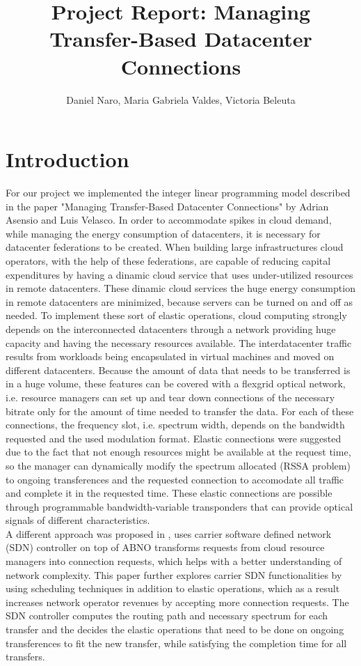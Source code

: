 \documentclass[11pt,a4paper]{article}
\title{Project Report: Managing Transfer-Based Datacenter Connections}
\author{Daniel Naro, Maria Gabriela Valdes, Victoria Beleuta}
\begin{document}
\maketitle
\section{Introduction}

For our project we implemented the integer linear programming model described in the paper "Managing Transfer-Based Datacenter Connections" by Adrian Asensio and Luis Velasco. In order to accommodate spikes in cloud demand, while managing the energy consumption of datacenters, it is necessary for datacenter federations to be created. When building large infrastructures cloud operators, with the help of these federations, are capable of reducing capital expenditures by having a dinamic cloud service that uses under-utilized resources in remote datacenters. These dinamic cloud services the huge energy consumption in remote datacenters are minimized, because servers can be turned on and off as needed. To implement these sort of elastic operations, cloud computing strongly depends on the interconnected datacenters through a network providing huge capacity and having the necessary resources available. The interdatacenter traffic results from workloads being encapsulated in virtual machines and moved on different datacenters. Because the amount of data that needs to be transferred is in a huge volume, these features can be covered with a flexgrid optical network, i.e. resource managers can set up and tear down connections of the necessary bitrate only for the amount of time needed to transfer the data. For each of these connections, the frequency slot, i.e. spectrum width, depends on the bandwidth requested and the used modulation format. Elastic connections were suggested due to the fact that not enough resources might be available at the request time, so the manager can dynamically modify the spectrum allocated (RSSA problem) to ongoing transferences and the requested connection to accomodate all traffic and complete it in the requested time. These elastic connections are possible through programmable bandwidth-variable transponders that can provide optical signals of different characteristics.\\

A different approach was proposed in \cite{1}, uses carrier software defined network (SDN) controller on top of ABNO transforms requests from cloud resource managers into connection requests, which helps with a better understanding of network complexity. This paper further explores carrier SDN functionalities by using scheduling techniques in addition to elastic operations, which as a result increases network operator revenues by accepting more connection requests. The SDN controller computes the routing path and necessary spectrum for each transfer and the decides the elastic operations that need to be done on ongoing transferences to fit the new transfer, while satisfying the completion time for all transfers.\\
\end{document}
